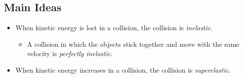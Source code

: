 \documentclass[]{article}
\begin{document}
\begin{PresentSpace}
\SpringSled
\SpringSledMomEn
\SpringSledFig
\end{PresentSpace}
\newpage
\begin{TeacherMargin}
	
\end{TeacherMargin}
\begin{PresentSpace}
\section*{Main Ideas}
\begin{itemize}
	\item When kinetic energy is lost in a collision, the collision is \textit{inelastic}.
	\begin{itemize}
		\item A collision in which the objects stick together and move with the same velocity is \textit{perfectly inelastic}.
	\end{itemize}
	\item When kinetic energy increases in a collision, the collision is \textit{superelastic}.
\end{itemize}
\end{PresentSpace}
\end{document}
